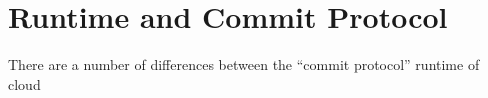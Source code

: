 

\section{Runtime and Commit Protocol}
There are a number of differences between the ``commit protocol'' runtime of cloud 
